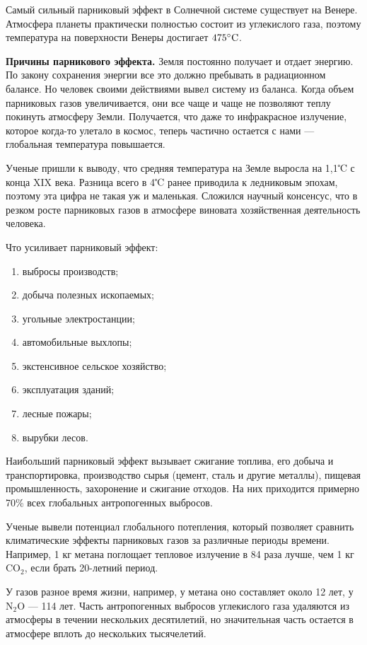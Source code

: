 Самый сильный парниковый эффект в Солнечной системе существует на Венере. Атмосфера планеты практически полностью состоит из углекислого газа, поэтому температура на поверхности Венеры достигает $475^\circ\rm{C}$.

\textbf{Причины парникового эффекта.}
Земля постоянно получает и отдает энергию. По закону сохранения энергии все это должно пребывать в радиационном балансе. Но человек своими действиями вывел систему из баланса. Когда объем парниковых газов увеличивается, они все чаще и чаще не позволяют теплу покинуть атмосферу Земли. Получается, что даже то инфракрасное излучение, которое когда-то улетало в космос, теперь частично остается с нами — глобальная температура повышается.

Ученые пришли к выводу, что средняя температура на Земле выросла на 1,1℃ с конца XIX века. Разница всего в 4℃ ранее приводила к ледниковым эпохам, поэтому эта цифра не такая уж и маленькая. Сложился научный консенсус, что в резком росте парниковых газов в атмосфере виновата хозяйственная деятельность человека.

Что усиливает парниковый эффект:
\begin{enumerate}
    \item выбросы производств;
    \item добыча полезных ископаемых;
    \item угольные электростанции;
    \item автомобильные выхлопы;
    \item экстенсивное сельское хозяйство;
    \item эксплуатация зданий;
    \item лесные пожары;
    \item вырубки лесов.
\end{enumerate}

Наибольший парниковый эффект вызывает сжигание топлива, его добыча и транспортировка, производство сырья (цемент, сталь и другие металлы), пищевая промышленность, захоронение и сжигание отходов. На них приходится примерно 70\% всех глобальных антропогенных выбросов.

Ученые вывели потенциал глобального потепления, который позволяет сравнить климатические эффекты парниковых газов за различные периоды времени. Например, 1 кг метана поглощает тепловое излучение в 84 раза лучше, чем 1 кг CO$_2$, если брать 20-летний период.

У газов разное время жизни, например, у метана оно составляет около 12 лет, у N$_2$O — 114 лет. Часть антропогенных выбросов углекислого газа удаляются из атмосферы в течении нескольких десятилетий, но значительная часть остается в атмосфере вплоть до нескольких тысячелетий.

